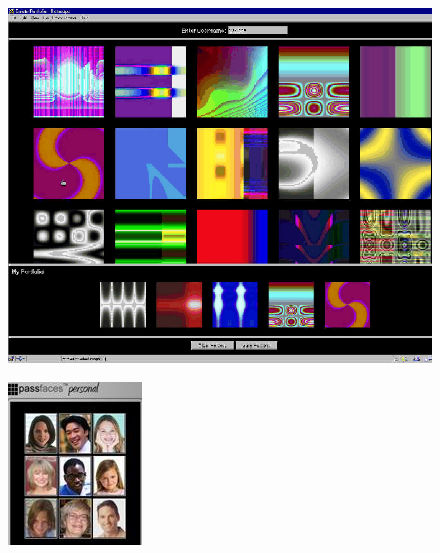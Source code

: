 \begin{anexos}
	
	
	
	
	\begin{figure}[H]
		\centering
		\includegraphics[width=0.5\linewidth]{Deja-Vu.jpg}
		\label{figure:deja-vu}
	\end{figure}


\begin{figure}[H]
	\centering
	\includegraphics[width=0.3\linewidth]{3.jpg}
	\label{passfaces}
\end{figure}


\end{anexos}
